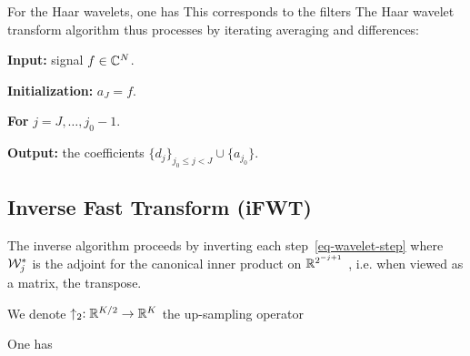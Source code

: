For the Haar wavelets, one has
This corresponds to the filters
The Haar wavelet transform algorithm thus processes by iterating averaging and differences:
\begin{rs}
	\item \textbf{Input:} signal $f \in \mathbb{C}^N$.
	\item \textbf{Initialization:} $a_J = f$.
	\item \textbf{For} $j=J,\ldots,j_0-1$.
	\item \textbf{Output:} the coefficients $\{ d_j \}_{j_0 \leq j < J} \cup \{ a_{j_0} \}$.
\end{rs}

\subsection{Inverse Fast Transform (iFWT)}

The inverse algorithm proceeds by inverting each step~\eqref{eq-wavelet-step}
where $\mathcal{W}_j^{*}$ is the adjoint for the canonical inner product on $\mathbb{R}^{2^{-j+1}}$ , i.e. when viewed as a matrix, the transpose.

We denote $\uparrow_2 : \mathbb{R}^{K/2} \rightarrow \mathbb{R}^K$ the up-sampling operator

\begin{prop}
One has
\end{prop}

